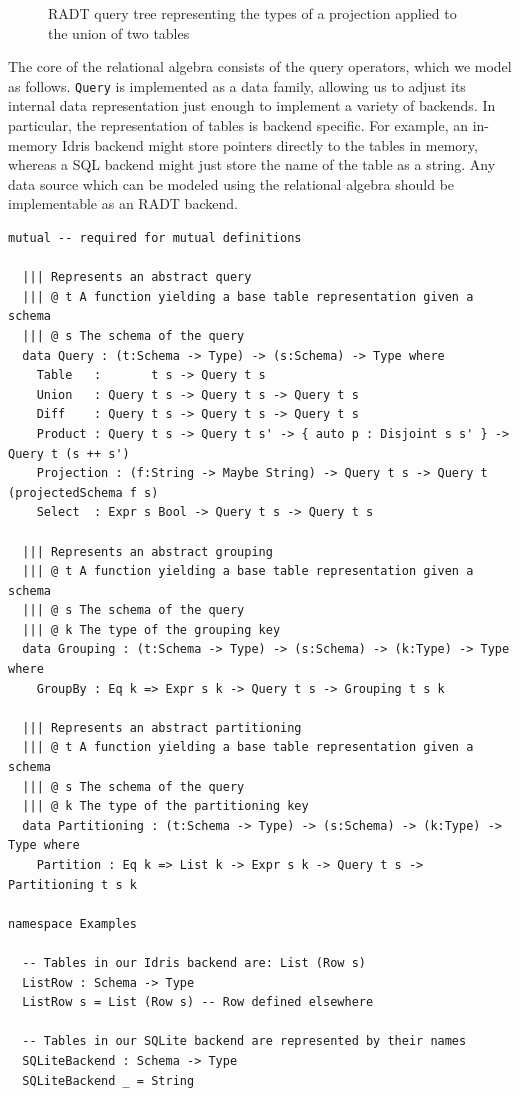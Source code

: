 \documentclass[12pt]{report}
\begin{document}
\begin{figure}
     \centering
     \def\svgwidth{0.75\linewidth}
     
     \caption{RADT query tree representing the types of a projection applied to the union of two tables}
     \label{fig:query_tree}
\end{figure}

The core of the relational algebra consists of the query operators, which we model as follows.
\texttt{Query} is implemented as a data family, allowing us to adjust its internal data representation just enough to implement a variety of backends.
In particular, the representation of tables is backend specific.
For example, an in-memory Idris backend might store pointers directly to the tables in memory, whereas a SQL backend might just store the name of the table as a string.
Any data source which can be modeled using the relational algebra should be implementable as an RADT backend.

\begin{lstlisting}[caption={Abstract representation of queries},label={lst:queries}]
mutual -- required for mutual definitions

  ||| Represents an abstract query
  ||| @ t A function yielding a base table representation given a schema
  ||| @ s The schema of the query
  data Query : (t:Schema -> Type) -> (s:Schema) -> Type where
    Table   :       t s -> Query t s
    Union   : Query t s -> Query t s -> Query t s
    Diff    : Query t s -> Query t s -> Query t s
    Product : Query t s -> Query t s' -> { auto p : Disjoint s s' } -> Query t (s ++ s')
    Projection : (f:String -> Maybe String) -> Query t s -> Query t (projectedSchema f s)
    Select  : Expr s Bool -> Query t s -> Query t s

  ||| Represents an abstract grouping
  ||| @ t A function yielding a base table representation given a schema
  ||| @ s The schema of the query
  ||| @ k The type of the grouping key
  data Grouping : (t:Schema -> Type) -> (s:Schema) -> (k:Type) -> Type where
    GroupBy : Eq k => Expr s k -> Query t s -> Grouping t s k

  ||| Represents an abstract partitioning
  ||| @ t A function yielding a base table representation given a schema
  ||| @ s The schema of the query
  ||| @ k The type of the partitioning key
  data Partitioning : (t:Schema -> Type) -> (s:Schema) -> (k:Type) -> Type where
    Partition : Eq k => List k -> Expr s k -> Query t s -> Partitioning t s k

namespace Examples

  -- Tables in our Idris backend are: List (Row s)
  ListRow : Schema -> Type
  ListRow s = List (Row s) -- Row defined elsewhere

  -- Tables in our SQLite backend are represented by their names
  SQLiteBackend : Schema -> Type
  SQLiteBackend _ = String
\end{lstlisting}
\end{document}
